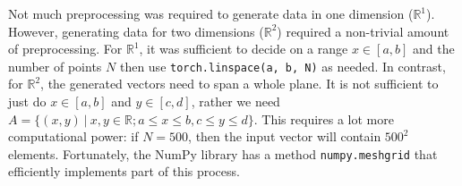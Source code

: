 \documentclass[12pt]{article}
\newcommand{\C}[1]{\lstinline{#1}}
\begin{document}
\begin{description}
    Not much preprocessing was required to generate data in one dimension
    ($\mathbb{R}^1$). However, generating data for two dimensions
    ($\mathbb{R}^2$) required a non-trivial amount of preprocessing. For
    $\mathbb{R}^1$, it was sufficient to decide on a range $x\in[a, b]$ and the
    number of points $N$ then use \C{torch.linspace(a, b, N)} as needed. In
    contrast, for $\mathbb{R}^2$, the generated vectors need to span a whole
    plane. It is not sufficient to just do $x\in[a, b]$ and $y\in[c, d]$,
    rather we need $A = \{(x, y)~|~x, y \in \mathbb{R};a\leq x \leq b, c \leq y
    \leq d \}$. This requires a lot more computational power: if $N = 500$,
    then the input vector will contain $500^2$ elements. Fortunately, the NumPy
    library has a method \C{numpy.meshgrid} that efficiently implements part of
    this process.


\end{description}
\end{document}
